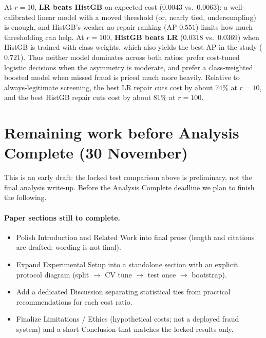 \documentclass[10pt,twocolumn,letterpaper]{article}
\begin{document}
At $r{=}10$, \textbf{LR beats HistGB} on expected cost ($0.0043$ vs.\ $0.0063$): a well-calibrated linear model with a moved threshold (or, nearly tied, undersampling) is enough, and HistGB's weaker no-repair ranking (AP $0.551$) limits how much thresholding can help.
At $r{=}100$, \textbf{HistGB beats LR} ($0.0318$ vs.\ $0.0369$) when HistGB is trained with class weights, which also yields the best AP in the study ($0.721$).
Thus neither model dominates across both ratios: prefer cost-tuned logistic decisions when the asymmetry is moderate, and prefer a class-weighted boosted model when missed fraud is priced much more heavily.
Relative to always-legitimate screening, the best LR repair cuts cost by about $74\%$ at $r{=}10$, and the best HistGB repair cuts cost by about $81\%$ at $r{=}100$.

\section{Remaining work before Analysis Complete (30 November)}
This is an early draft: the locked test comparison above is preliminary, not the final analysis write-up.
Before the Analysis Complete deadline we plan to finish the following.

\paragraph{Paper sections still to complete.}
\begin{itemize}
  \item Polish Introduction and Related Work into final prose (length and citations are drafted; wording is not final).
  \item Expand Experimental Setup into a standalone section with an explicit protocol diagram (split $\rightarrow$ CV tune $\rightarrow$ test once $\rightarrow$ bootstrap).
  \item Add a dedicated Discussion separating statistical ties from practical recommendations for each cost ratio.
  \item Finalize Limitations / Ethics (hypothetical costs; not a deployed fraud system) and a short Conclusion that matches the locked results only.
\end{itemize}
\end{document}
